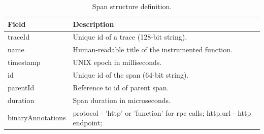 \begin{table}[H]
    \caption{Span structure definition.}
    \label{table:data_set_span_structure_definition}
    \centering
    \begin{tabularx}{\linewidth} {
        |>{\hsize=0.60\hsize}X|
        >{\hsize=1.40\hsize}X|}
        \hline
        \textbf{Field}
         & \textbf{Description}                                                                                                                                                                                                     \\ \hline \hline
        traceId
         & Unique id of a trace (128-bit string).                                                                                                                                                                                   \\ \hline
        name
         & Human-readable title of the instrumented function.                                                                                                                                                                       \\ \hline
        timestamp
         & UNIX epoch in milliseconds.                                                                                                                                                                                              \\ \hline
        id
         & Unique id of the span (64-bit string).                                                                                                                                                                                   \\ \hline
        parentId
         & Reference to id of parent span.                                                                                                                                                                                          \\ \hline
        duration
         & Span duration in microseconds.                                                                                                                                                                                           \\ \hline
        binaryAnnotations
         &
        protocol - '\gls{http}' or 'function' for \gls{rpc} calls; \newline
        http.url - \gls{http} endpoint; \newline

\end{tabularx}
\end{table}
